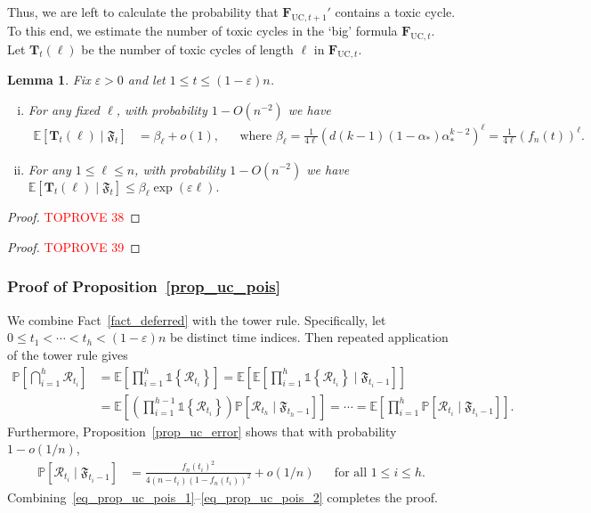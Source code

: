 \documentclass[10pt,reqno]{amsart}
\numberwithin{equation}{section}
\newcommand{\pastim}{\fF_{t_i-1}}
\newcommand{\pasthm}{\fF_{t_h-1}}
\newcommand{\everrti}{\cR_{t_i}}
\newcommand{\everrth}{\cR_{t_h}}
\renewcommand{\vec}[1]{\boldsymbol{#1}}
\newcommand{\FUC}[1]{\PHI_{\mathrm{UC},{#1}}}
\newcommand\PHI{\vec F}
\newcommand\cR{\mathcal R}
\newcommand\fF{\mathfrak F}
\newcommand\vT{\vec T}
\newcommand\eps{\varepsilon}
\newcommand\Erw{\mathbb{E}}
\newcommand\ex{\Erw}
\newcommand{\vecone}{\mathbb{1}}
\newcommand\bc[1]{\left({#1}\right)}
\newcommand\cbc[1]{\left\{{#1}\right\}}
\newcommand\brk[1]{\left\lbrack{#1}\right\rbrack}
\newcommand\pr{\mathbb{P}}
\renewcommand\Pr{\pr}
\newcommand\Prop{Proposition}
\newtheorem{lemma}[definition]{Lemma}
\def\pr{{\mathbb P}}
\begin{document}
	Thus, we are left to calculate the probability that $\FUC{t+1}'$ contains a toxic cycle.
	To this end, we estimate the number of toxic cycles in the `big' formula $\FUC t$.
	Let $\vT_{t}(\ell)$ be the number of toxic cycles of length $\ell$ in $\FUC t$.

	\begin{lemma}\label{lem_toxlt}
	Fix $\eps>0$ and let $1\leq t\leq(1-\eps)n$.
	\begin{enumerate}[(i)]
		\item For any fixed $\ell$, with probability $1-O(n^{-2})$ we have
		\begin{align*}
			\ex\brk{\vT_t\bc\ell\mid\fF_t}&=\beta_\ell+o(1),&&\mbox{where }\beta_\ell=\frac{1}{4\ell} \bc{ d(k-1) (1-\alpha_*)\alpha_*^{k-2} }^\ell = \frac 1 {4\ell} \bc{f_n(t)}^\ell.
		\end{align*}
	\item For any $1\leq\ell\leq n$, with probability $1-O(n^{-2})$ we have $\ex\brk{\vT_t\bc{\ell}\mid\fF_t}\leq\beta_\ell\exp(\eps\ell).$ \end{enumerate}
	\end{lemma}
	\begin{proof}\textcolor{red}{TOPROVE 38}\end{proof}
	
\begin{proof}\textcolor{red}{TOPROVE 39}\end{proof}





\subsubsection{Proof of \Prop~\ref{prop_uc_pois}}\label{sec_prop_uc_pois}
	We combine Fact~\ref{fact_deferred} with the tower rule.
	Specifically, let $0\leq t_1<\cdots<t_h<(1-\eps)n$ be distinct time indices.
	Then repeated application of the tower rule gives
	\begin{align}\nonumber
		\Pr\brk{\bigcap_{i=1}^h \everrti}&= \Erw\brk{\prod_{i=1}^h \vecone\cbc{\everrti}} =  \Erw\brk{ \Erw\brk{\prod_{i=1}^h \vecone \cbc{\everrti} \mid \pastim } }\\
										 &= \Erw\brk{ \bc{\prod_{i=1}^{h-1} \vecone\cbc{\everrti}}  \pr\brk{\everrth \mid \pasthm } } = \cdots=\Erw\brk{\prod_{i=1}^{h} \pr\brk{\everrti \mid \pastim }  }.\label{eq_prop_uc_pois_1}
	\end{align}
	Furthermore, \Prop~\ref{prop_uc_error} shows that with probability $1-o(1/n)$,
	\begin{align}\label{eq_prop_uc_pois_2}
		\pr\brk{\everrti \mid \pastim }&= \frac{f_n(t_i)^2}{4(n-t_i)(1-f_n(t_i))^2}+o(1/n)&&\mbox{for all }1\leq i\leq h.
	\end{align}
Combining~\eqref{eq_prop_uc_pois_1}--\eqref{eq_prop_uc_pois_2} completes the proof.
\end{document}
